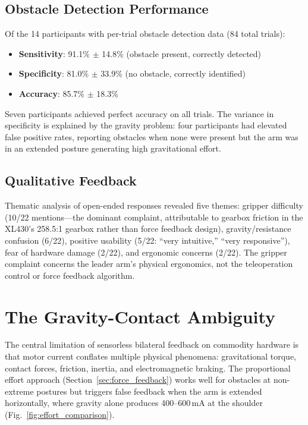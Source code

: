 \documentclass[conference]{IEEEtran}
\begin{document}
\subsection{Obstacle Detection Performance}

Of the 14 participants with per-trial obstacle detection data (84 total trials):

\begin{itemize}
    \item \textbf{Sensitivity}: 91.1\% $\pm$ 14.8\% (obstacle present, correctly detected)
    \item \textbf{Specificity}: 81.0\% $\pm$ 33.9\% (no obstacle, correctly identified)
    \item \textbf{Accuracy}: 85.7\% $\pm$ 18.3\%
\end{itemize}

Seven participants achieved perfect accuracy on all trials. The variance in specificity is explained by the gravity problem: four participants had elevated false positive rates, reporting obstacles when none were present but the arm was in an extended posture generating high gravitational effort.

\subsection{Qualitative Feedback}

Thematic analysis of open-ended responses revealed five themes: gripper difficulty (10/22 mentions---the dominant complaint, attributable to gearbox friction in the XL430's 258.5:1 gearbox rather than force feedback design), gravity/resistance confusion (6/22), positive usability (5/22: ``very intuitive,'' ``very responsive''), fear of hardware damage (2/22), and ergonomic concerns (2/22). The gripper complaint concerns the leader arm's physical ergonomics, not the teleoperation control or force feedback algorithm.

\section{The Gravity-Contact Ambiguity}
\label{sec:gravity}

The central limitation of sensorless bilateral feedback on commodity hardware is that motor current conflates multiple physical phenomena: gravitational torque, contact forces, friction, inertia, and electromagnetic braking. The proportional effort approach (Section~\ref{sec:force_feedback}) works well for obstacles at non-extreme postures but triggers false feedback when the arm is extended horizontally, where gravity alone produces 400--600\,mA at the shoulder (Fig.~\ref{fig:effort_comparison}).
\end{document}
